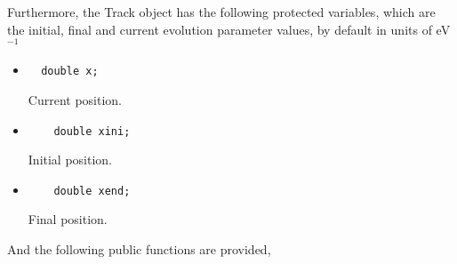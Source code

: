 \documentclass[3p,12pt]{elsarticle}
\newcommand{\ttf}{\ttfamily}
\begin{document}
Furthermore, the {\ttf Track} object has the following protected
variables, which are the initial, final and current
evolution parameter values, by default in units of eV$^{-1}$
%
%
\begin{itemize}
\item  
  \begin{lstlisting}
  double x;
  \end{lstlisting}
  Current position.
\item  
  \begin{lstlisting}
    double xini;
  \end{lstlisting}
  Initial position.
\item  
  \begin{lstlisting}
    double xend;
  \end{lstlisting}
  Final position.
\end{itemize}
%
And the following public functions are provided,
%
\end{document}

